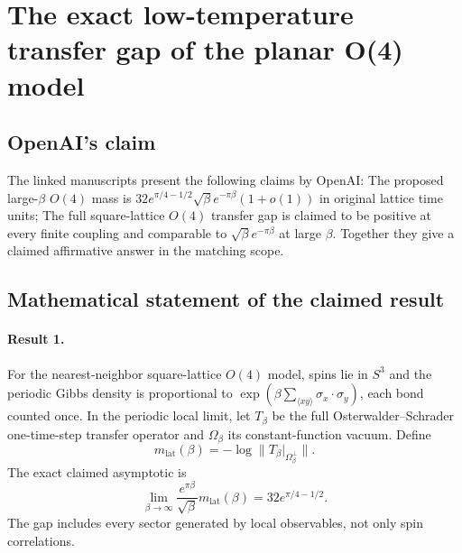 \documentclass[11pt]{article}
\begin{document}
\section*{The exact low-temperature transfer gap of the planar O(4) model}

\subsection{OpenAI's claim}
The linked manuscripts present the following claims by OpenAI: The proposed large-$\beta$ $O(4)$ mass is $32e^{\pi/4-1/2}\sqrt\beta e^{-\pi\beta}(1+o(1))$ in original lattice time units; The full square-lattice $O(4)$ transfer gap is claimed to be positive at every finite coupling and comparable to $\sqrt\beta e^{-\pi\beta}$ at large $\beta$. Together they give a claimed affirmative answer in the matching scope.

\subsection{Mathematical statement of the claimed result}
\paragraph{Result 1.} For the nearest-neighbor square-lattice \(O(4)\) model, spins lie in \(S^3\) and the periodic Gibbs density is proportional to \(\exp(\beta\sum_{\langle xy\rangle}\sigma_x\cdot\sigma_y)\), each bond counted once. In the periodic local limit, let \(T_\beta\) be the full Osterwalder--Schrader one-time-step transfer operator and \(\Omega_\beta\) its constant-function vacuum. Define
\[
 m_{\mathrm{lat}}(\beta)=-\log\|T_\beta|_{\Omega_\beta^\perp}\|.
\]
The exact claimed asymptotic is
\[
 \lim_{\beta\to\infty}\frac{e^{\pi\beta}}{\sqrt\beta}m_{\mathrm{lat}}(\beta)
 =32e^{\pi/4-1/2}.
\]
The gap includes every sector generated by local observables, not only spin correlations.
\end{document}
